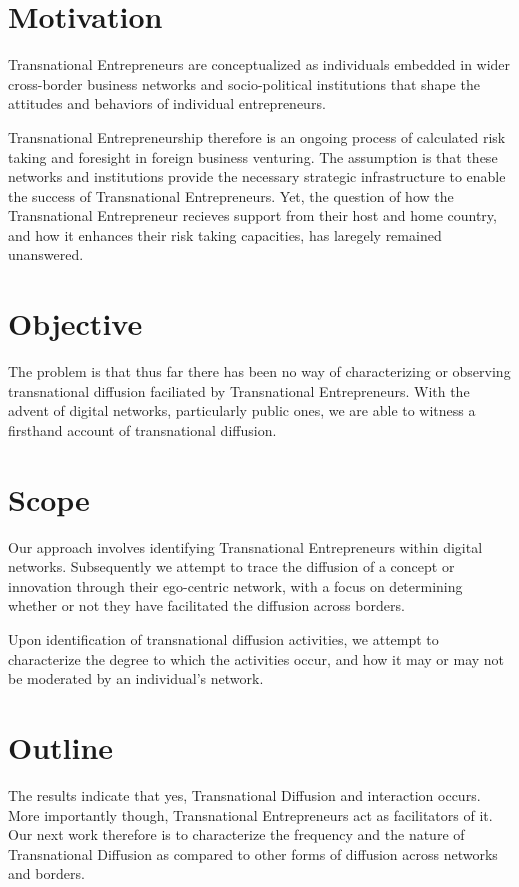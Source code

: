 \section{Motivation}
Transnational Entrepreneurs are conceptualized as individuals embedded
in wider cross-border business networks and socio-political
institutions that shape the attitudes and behaviors of individual
entrepreneurs.

Transnational Entrepreneurship therefore is an ongoing process of
calculated risk taking and foresight in foreign business
venturing. The assumption is that these networks and institutions
provide the necessary strategic infrastructure to enable the success
of Transnational Entrepreneurs. Yet, the question of how the
Transnational Entrepreneur recieves support from their host and home
country, and how it enhances their risk taking capacities, has
laregely remained unanswered.

\section{Objective}
The problem is that thus far there has been no way of characterizing
or observing transnational diffusion faciliated by Transnational
Entrepreneurs. With the advent of digital networks, particularly
public ones, we are able to witness a firsthand account of
transnational diffusion.

\section{Scope}
Our approach involves identifying Transnational Entrepreneurs within
digital networks. Subsequently we attempt to trace the diffusion of a
concept or innovation through their ego-centric network, with a focus
on determining whether or not they have facilitated the diffusion
across borders.

Upon identification of transnational diffusion activities, we attempt
to characterize the degree to which the activities occur, and how it
may or may not be moderated by an individual's network.

\section{Outline}
The results indicate that yes, Transnational Diffusion and interaction
occurs. More importantly though, Transnational Entrepreneurs act as
facilitators of it. Our next work therefore is to characterize the
frequency and the nature of Transnational Diffusion as compared to
other forms of diffusion across networks and borders.

